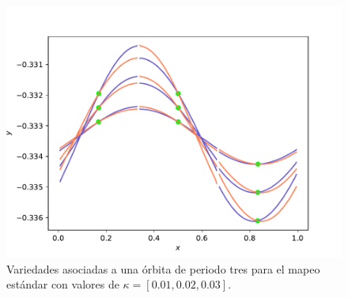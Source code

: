 \begin{figure}
	\centering
	\includegraphics[scale=0.7]{variedadesestperiodo3kvar}
	\caption{Variedades asociadas a una \'orbita de periodo tres para el mapeo est\'andar con valores de $\kappa = [0.01,0.02,0.03]$. }
	\label{vairedadesperiodo3kvariable}
\end{figure}





